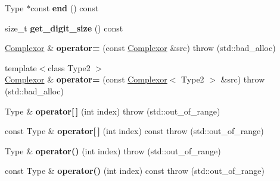 \begin{DoxyCompactItemize}
Type $\ast$const {\bfseries end} () const
\item 
\mbox{\label{classkerbal_1_1math_1_1_complexor_af01aa36ba6f8ff09eeb8eeefbc785a72}} 
size\+\_\+t {\bfseries get\+\_\+digit\+\_\+size} () const
\item 
\mbox{\label{classkerbal_1_1math_1_1_complexor_a44a0f40f6936cfd44f5e748068794a80}} 
\hyperlink{classkerbal_1_1math_1_1_complexor}{Complexor} \& {\bfseries operator=} (const \hyperlink{classkerbal_1_1math_1_1_complexor}{Complexor} \&src)  throw (std\+::bad\+\_\+alloc)
\item 
\mbox{\label{classkerbal_1_1math_1_1_complexor_a1aef92b8d4a1cedc0d8eec7d4593e652}} 
{\footnotesize template$<$class Type2 $>$ }\\\hyperlink{classkerbal_1_1math_1_1_complexor}{Complexor} \& {\bfseries operator=} (const \hyperlink{classkerbal_1_1math_1_1_complexor}{Complexor}$<$ Type2 $>$ \&src)  throw (std\+::bad\+\_\+alloc)
\item 
\mbox{\label{classkerbal_1_1math_1_1_complexor_a5310034aa6ca92cf5eb729bcdd515535}} 
Type \& {\bfseries operator\mbox{[}$\,$\mbox{]}} (int index)  throw (std\+::out\+\_\+of\+\_\+range)
\item 
\mbox{\label{classkerbal_1_1math_1_1_complexor_add5d06646b9b2d57bf693f4d9486d509}} 
const Type \& {\bfseries operator\mbox{[}$\,$\mbox{]}} (int index) const  throw (std\+::out\+\_\+of\+\_\+range)
\item 
\mbox{\label{classkerbal_1_1math_1_1_complexor_a81f586fee5b2b910a94c753b400e9f7c}} 
Type \& {\bfseries operator()} (int index)  throw (std\+::out\+\_\+of\+\_\+range)
\item 
\mbox{\label{classkerbal_1_1math_1_1_complexor_a5622b64cd0d8d8f7979fed2424be11ee}} 
const Type \& {\bfseries operator()} (int index) const  throw (std\+::out\+\_\+of\+\_\+range)
\item 
\mbox{\label{classkerbal_1_1math_1_1_complexor_a849e46ebb93b05cd917d5e5509c69dc3}} 

\end{DoxyCompactItemize}
